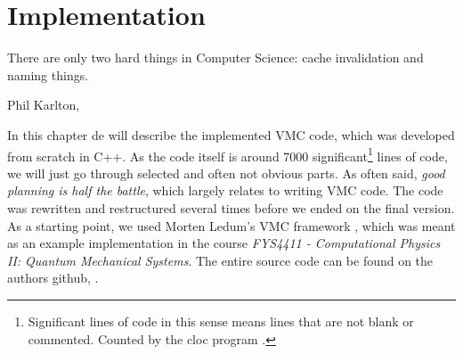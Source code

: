 \chapter{Implementation} \label{sec:implementation}
\epigraph{There are only two hard things in Computer Science: cache invalidation and naming things.}{Phil Karlton, \cite{fowler_bliki:_nodate}}

In this chapter de will describe the implemented VMC code, which was developed from scratch in C++. As the code itself is around 7000 significant\footnote{Significant lines of code in this sense means lines that are not blank or commented. Counted by the cloc program \cite{aldanial_cloc_2019}.} lines of code, we will just go through selected and often not obvious parts. As often said, \textit{good planning is half the battle}, which largely relates to writing VMC code. The code was rewritten and restructured several times before we ended on the final version. As a starting point, we used Morten Ledum's VMC framework \cite{ledum_simple_2016}, which was meant as an example implementation in the course \textit{FYS4411 - Computational Physics II: Quantum Mechanical Systems}. The entire source code can be found on the authors github, \cite{nordhagen_general_2019}.

